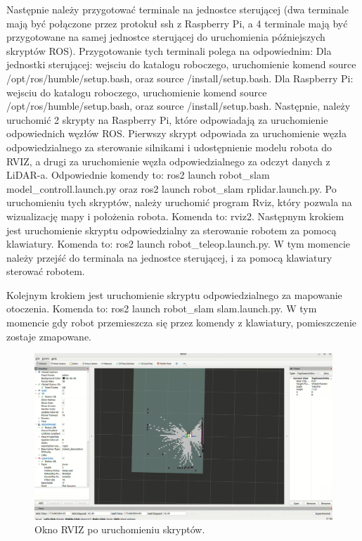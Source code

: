 \documentclass[a4paper,twoside,12pt]{book}
\begin{document}
Następnie należy przygotować terminale na jednostce sterującej (dwa terminale mają być połączone przez protokuł ssh z Raspberry Pi, a 4 terminale mają być przygotowane na samej jednostce sterującej do uruchomienia późniejszych skryptów ROS). Przygotowanie tych terminali polega na odpowiednim:
\newline
Dla jednostki sterującej: wejsciu do katalogu roboczego, uruchomienie komend source /opt/ros/humble/setup.bash, oraz source /install/setup.bash.
\newline\newline
Dla Raspberry Pi: wejsciu do katalogu roboczego, uruchomienie komend source /opt/ros/humble/setup.bash, oraz source /install/setup.bash.
\newline\newline
Następnie, należy uruchomić 2 skrypty na Raspberry Pi, które odpowiadają za uruchomienie odpowiednich węzłów ROS. Pierwszy skrypt odpowiada za uruchomienie węzła odpowiedzialnego za sterowanie silnikami i udostępnienie modelu robota do RVIZ, a drugi za uruchomienie węzła odpowiedzialnego za odczyt danych z LiDAR-a. Odpowiednie komendy to: ros2 launch robot\_slam model\_controll.launch.py oraz ros2 launch robot\_slam rplidar.launch.py.
\newline\newline
\newpage
Po uruchomieniu tych skryptów, należy uruchomić program Rviz, który pozwala na wizualizację mapy i położenia robota. Komenda to: rviz2. Następnym krokiem jest uruchomienie skryptu odpowiedzialny za sterowanie robotem za pomocą klawiatury. Komenda to: ros2 launch robot\_teleop.launch.py. W tym momencie należy przejść do terminala na jednostce sterującej, i za pomocą klawiatury sterować robotem. 
\newline

Kolejnym krokiem jest uruchomienie skryptu odpowiedzialnego za mapowanie otoczenia. Komenda to: ros2 launch robot\_slam slam.launch.py. W tym momencie gdy robot przemieszcza się przez komendy z klawiatury, pomieszczenie zostaje zmapowane.

\begin{figure}[!hb]
	\centering
	\includegraphics[width=1\textwidth]{images/launch-map.png}
	\caption{Okno RVIZ po uruchomieniu skryptów.}
	\label{fig:launch-map}
\end{figure}
\end{document}
